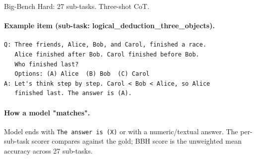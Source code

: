 Big-Bench Hard: 27 sub-tasks. Three-shot CoT.

\paragraph{Example item (sub-task: logical\_deduction\_three\_objects).}
\begin{verbatim}
Q: Three friends, Alice, Bob, and Carol, finished a race.
   Alice finished after Bob. Carol finished before Bob.
   Who finished last?
   Options: (A) Alice  (B) Bob  (C) Carol
A: Let's think step by step. Carol < Bob < Alice, so Alice
   finished last. The answer is (A).
\end{verbatim}

\paragraph{How a model "matches".} Model ends with
\verb|The answer is (X)| or with a numeric/textual answer. The
per-sub-task scorer compares against the gold; BBH score is the
unweighted mean accuracy across 27 sub-tasks.
